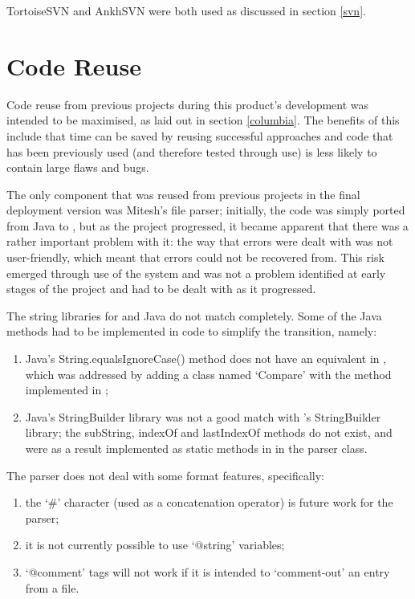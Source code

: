 TortoiseSVN and AnkhSVN were both used as discussed in section \ref{svn}.

\section{Code Reuse}
\label{codeReuse}
Code reuse from previous projects during this product's development was intended to be maximised, as laid out in section \ref{columbia}.  The benefits of this include that time can be saved by reusing successful approaches and code that has been previously used (and therefore tested through use) is less likely to contain large flaws and bugs.

The only component that was reused from previous projects in the final deployment version was Mitesh's \bibtex{} file parser;  initially, the code was simply ported from Java to \cs, but as the project progressed, it became apparent that there was a rather important problem with it: the way that errors were dealt with was not user-friendly, which meant that errors could not be recovered from.  This risk emerged through use of the system and was not a problem identified at early stages of the project and had to be dealt with as it progressed.

The string libraries for \cs and Java do not match completely.  Some of the Java methods had to be implemented in \cs code to simplify the transition, namely:
\begin{enumerate}
	\item Java's String.equalsIgnoreCase() method does not have an equivalent in \cs, which was addressed by adding a class named `Compare' with the method implemented in \cs;
	\item Java's StringBuilder library was not a good match with \cs's StringBuilder library; the subString, indexOf and lastIndexOf methods do not exist, and were as a result implemented as static methods in \cs in the parser class.
\end{enumerate}

The parser does not deal with some \bibtex{} format features, specifically:
\begin{enumerate}
	\item the `\#' character (used as a concatenation operator) is future work for the parser;
	\item it is not currently possible to use `@string' variables;
	\item `@comment' tags will not work if it is intended to `comment-out' an entry from a file.
\end{enumerate}
	

